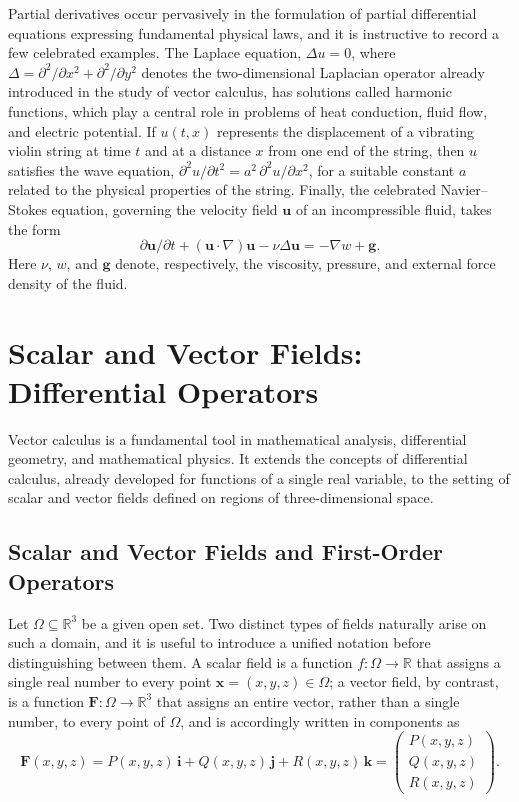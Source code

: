 Partial derivatives occur pervasively in the formulation of partial differential equations expressing fundamental physical laws, and it is instructive to record a few celebrated examples. The Laplace equation, $\Delta u = 0$, where $\Delta = \partial^2/\partial x^2 + \partial^2/\partial y^2$ denotes the two-dimensional Laplacian operator already introduced in the study of vector calculus, has solutions called harmonic functions, which play a central role in problems of heat conduction, fluid flow, and electric potential. If $u(t,x)$ represents the displacement of a vibrating violin string at time $t$ and at a distance $x$ from one end of the string, then $u$ satisfies the wave equation, $\partial^2 u/\partial t^2 = a^2 \, \partial^2 u/\partial x^2$, for a suitable constant $a$ related to the physical properties of the string. Finally, the celebrated Navier--Stokes equation, governing the velocity field $\mathbf{u}$ of an incompressible fluid, takes the form
\[
\partial \mathbf{u}/\partial t + (\mathbf{u} \cdot \nabla)\mathbf{u} - \nu \Delta \mathbf{u} = -\nabla w + \mathbf{g}.
\]
Here $\nu$, $w$, and $\mathbf{g}$ denote, respectively, the viscosity, pressure, and external force density of the fluid.

\section{Scalar and Vector Fields: Differential Operators}
\label{sec:vector-operators}

Vector calculus is a fundamental tool in mathematical analysis, differential geometry, and mathematical physics. It extends the concepts of differential calculus, already developed for functions of a single real variable, to the setting of scalar and vector fields defined on regions of three-dimensional space.

\subsection{Scalar and Vector Fields and First-Order Operators}

Let $\Omega \subseteq \mathbb{R}^3$ be a given open set. Two distinct types of fields naturally arise on such a domain, and it is useful to introduce a unified notation before distinguishing between them. A scalar field is a function $f : \Omega \to \mathbb{R}$ that assigns a single real number to every point $\mathbf{x} = (x,y,z) \in \Omega$; a vector field, by contrast, is a function $\mathbf{F} : \Omega \to \mathbb{R}^3$ that assigns an entire vector, rather than a single number, to every point of $\Omega$, and is accordingly written in components as
\[
\mathbf{F}(x,y,z) = P(x,y,z) \, \mathbf{i} + Q(x,y,z) \, \mathbf{j} + R(x,y,z) \, \mathbf{k} = \begin{pmatrix} P(x,y,z) \\ Q(x,y,z) \\ R(x,y,z) \end{pmatrix}.
\]

